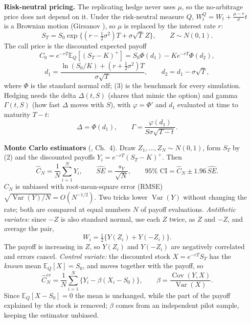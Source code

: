 \documentclass[10pt,a4paper]{article}
\newcommand{\E}{\mathbb{E}}\newcommand{\Var}{\operatorname{Var}}\newcommand{\Cov}{\operatorname{Cov}}
\begin{document}
\textbf{Risk-neutral pricing.} The replicating hedge never uses $\mu$, so the no-arbitrage price does not depend on it. Under the risk-neutral measure $Q$, $W^Q_t=W_t+\frac{\mu-r}{\sigma}t$ is a Brownian motion (Girsanov \cite{sh}), so $\mu$ is replaced by the interest rate $r$:
\begin{equation}S_T=S_0\exp\{(r-\tfrac12\sigma^2)T+\sigma\sqrt T\,Z\},\qquad Z\sim N(0,1).\end{equation}
The call price is the discounted expected payoff
\begin{equation}C_0=e^{-rT}\E_Q[(S_T-K)^+]=S_0\Phi(d_1)-Ke^{-rT}\Phi(d_2),\end{equation}\begin{equation*}d_1=\frac{\ln(S_0/K)+(r+\frac12\sigma^2)T}{\sigma\sqrt T},\qquad d_2=d_1-\sigma\sqrt T,\end{equation*}
where $\Phi$ is the standard normal cdf; (3) is the benchmark for every simulation. Hedging needs the delta $\Delta(t,S)$ (shares that mimic the option) and gamma $\Gamma(t,S)$ (how fast $\Delta$ moves with $S$), with $\varphi=\Phi'$ and $d_1$ evaluated at time to maturity $T-t$:
\begin{equation}\Delta=\Phi(d_1),\qquad \Gamma=\frac{\varphi(d_1)}{S\sigma\sqrt{T-t}}.\end{equation}

\textbf{Monte Carlo estimators} (\cite{gl}, Ch.~4). Draw $Z_1,\dots,Z_N\sim N(0,1)$, form $S_T$ by (2) and the discounted payoffs $Y_i=e^{-rT}(S_T-K)^+$. Then
\begin{equation}\hat C_N=\frac1N\sum_{i=1}^NY_i,\qquad \widehat{SE}=\frac{s_Y}{\sqrt N},\qquad 95\%\text{ CI}=\hat C_N\pm1.96\,\widehat{SE}.\end{equation}
$\hat C_N$ is unbiased with root-mean-square error (RMSE) $\sqrt{\Var(Y)/N}=O(N^{-1/2})$. Two tricks lower $\Var(Y)$ without changing the rate; both are compared at equal numbers $N$ of payoff evaluations. \emph{Antithetic variates:} since $-Z$ is also standard normal, use each $Z$ twice, as $Z$ and $-Z$, and average the pair,
\begin{equation}W_i=\tfrac12\{Y(Z_i)+Y(-Z_i)\}.\end{equation}
The payoff is increasing in $Z$, so $Y(Z_i)$ and $Y(-Z_i)$ are negatively correlated and errors cancel. \emph{Control variate:} the discounted stock $X=e^{-rT}S_T$ has the \emph{known} mean $\E_Q[X]=S_0$, and moves together with the payoff, so
\begin{equation}\hat C^{cv}_N=\frac1N\sum_{i=1}^N\{Y_i-\beta(X_i-S_0)\},\qquad\beta=\frac{\Cov(Y,X)}{\Var(X)}.\end{equation}
Since $\E_Q[X-S_0]=0$ the mean is unchanged, while the part of the payoff explained by the stock is removed; $\beta$ comes from an independent pilot sample, keeping the estimator unbiased.
\end{document}
